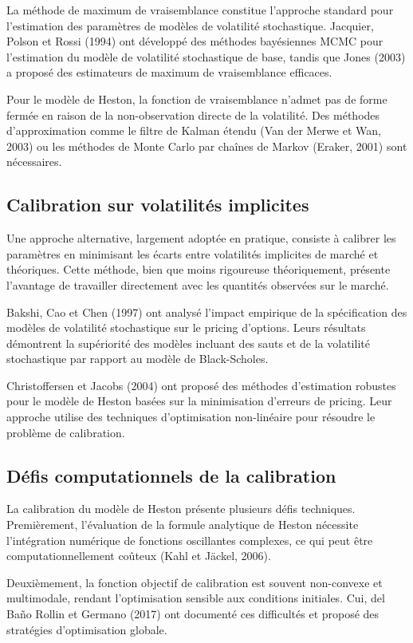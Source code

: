 La méthode de maximum de vraisemblance constitue l'approche standard pour l'estimation des paramètres de modèles de volatilité stochastique. Jacquier, Polson et Rossi (1994) ont développé des méthodes bayésiennes MCMC pour l'estimation du modèle de volatilité stochastique de base, tandis que Jones (2003) a proposé des estimateurs de maximum de vraisemblance efficaces.

Pour le modèle de Heston, la fonction de vraisemblance n'admet pas de forme fermée en raison de la non-observation directe de la volatilité. Des méthodes d'approximation comme le filtre de Kalman étendu (Van der Merwe et Wan, 2003) ou les méthodes de Monte Carlo par chaînes de Markov (Eraker, 2001) sont nécessaires.

\subsection{Calibration sur volatilités implicites}

Une approche alternative, largement adoptée en pratique, consiste à calibrer les paramètres en minimisant les écarts entre volatilités implicites de marché et théoriques. Cette méthode, bien que moins rigoureuse théoriquement, présente l'avantage de travailler directement avec les quantités observées sur le marché.

Bakshi, Cao et Chen (1997) ont analysé l'impact empirique de la spécification des modèles de volatilité stochastique sur le pricing d'options. Leurs résultats démontrent la supériorité des modèles incluant des sauts et de la volatilité stochastique par rapport au modèle de Black-Scholes.

Christoffersen et Jacobs (2004) ont proposé des méthodes d'estimation robustes pour le modèle de Heston basées sur la minimisation d'erreurs de pricing. Leur approche utilise des techniques d'optimisation non-linéaire pour résoudre le problème de calibration.

\subsection{Défis computationnels de la calibration}

La calibration du modèle de Heston présente plusieurs défis techniques. Premièrement, l'évaluation de la formule analytique de Heston nécessite l'intégration numérique de fonctions oscillantes complexes, ce qui peut être computationnellement coûteux (Kahl et Jäckel, 2006).

Deuxièmement, la fonction objectif de calibration est souvent non-convexe et multimodale, rendant l'optimisation sensible aux conditions initiales. Cui, del Baño Rollin et Germano (2017) ont documenté ces difficultés et proposé des stratégies d'optimisation globale.

